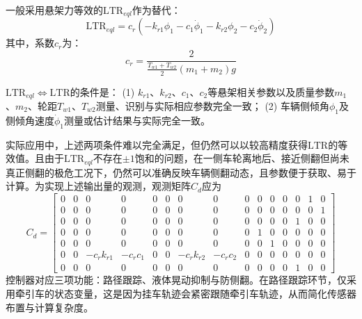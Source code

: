             一般采用悬架力等效的$\mathrm{LTR}_{eql}$作为替代：
            \begin{equation}
            \mathrm{LTR}_{eql} = c_r(-k_{r1}\phi_1 - c_1 \dot{\phi}_1 - k_{r2}\phi_2 - c_2 \dot{\phi}_2)
            \end{equation}
            \noindent 其中，系数$c_r$为：
            \begin{equation}
            c_r = \frac{2}{\frac{T_{w1} + T_{w2}}{2}(m_1 + m_2)g}
            \end{equation}

            $\mathrm{LTR}_{eql} \Leftrightarrow \mathrm{LTR}$的条件是：
            (1) $k_{r1}$、$k_{r2}$、$c_1$、$c_2$等悬架相关参数以及质量参数$m_1$、$m_2$、轮距$T_{w1}$、$T_{w2}$测量、识别与实际相应参数完全一致；
            (2) 车辆侧倾角$\phi_1$及侧倾角速度$\dot{\phi}_1$测量或估计结果与实际完全一致。

            实际应用中，上述两项条件难以完全满足，但仍然可以以较高精度获得$\mathrm{LTR}$的等效值。且由于$\mathrm{LTR}_{eql}$不存在$\pm1$饱和的问题，在一侧车轮离地后、接近侧翻但尚未真正侧翻的极危工况下，仍然可以准确反映车辆侧翻动态，且参数便于获取、易于计算。为实现上述输出量的观测，观测矩阵$C_d$应为
            \begin{equation}
            C_d = \begin{bmatrix}
            0 & 0 & 0 & 0 & 0 & 0 & 0 & 0 & 0 & 0 & 0 & 0 & 0 & 1 & 0 \\
            0 & 0 & 0 & 0 & 0 & 0 & 0 & 0 & 0 & 0 & 0 & 0 & 0 & 0 & 1 \\
            0 & 0 & 0 & 0 & 0 & 0 & 0 & 0 & 0 & 0 & 0 & 0 & 1 & 0 & 0 \\
            0 & 0 & 0 & 0 & 0 & 0 & 0 & 0 & 0 & 1 & 0 & 0 & 0 & 0 & 0 \\
            0 & 0 & 0 & 0 & 0 & 0 & 0 & 0 & 0 & 0 & 1 & 0 & 0 & 0 & 0 \\
            0 & 0 & -c_r k_{r1} & -c_r c_1 & 0 & 0 & -c_r k_{r2} & -c_r c_2 & 0 & 0 & 0 & 0 & 0 & 0 & 0 \\
            0 & 0 & 0 & 0 & 0 & 0 & 0 & 0 & 0 & 0 & 0 & 0 & 1 & 0 & 0
            \end{bmatrix}
            \end{equation}
            控制器对应三项功能：路径跟踪、液体晃动抑制与防侧翻。在路径跟踪环节，仅采用牵引车的状态变量，这是因为挂车轨迹会紧密跟随牵引车轨迹，从而简化传感器布置与计算复杂度。
        
